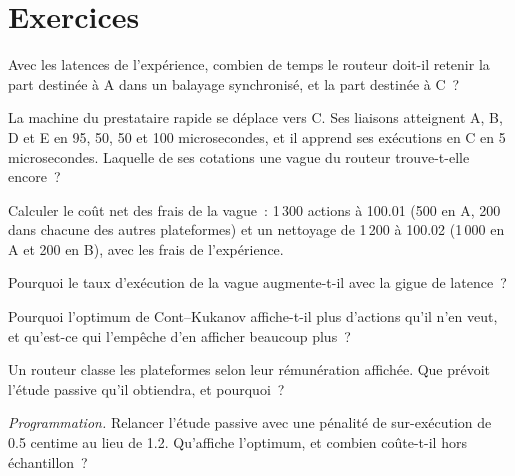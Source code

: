 \section{Exercices}

\begin{exercise}[$\star$]\label{exo:mx:smart-order-routing:1}
Avec les latences de l'expérience, combien de temps le routeur doit-il retenir la part destinée à A dans un balayage synchronisé, et la part destinée à C~?
\end{exercise}

\begin{exercise}[$\star$]\label{exo:mx:smart-order-routing:2}
La machine du prestataire rapide se déplace vers C. Ses liaisons atteignent A, B, D et E en 95, 50, 50 et 100 microsecondes, et il apprend ses exécutions en C en
5 microsecondes. Laquelle de ses cotations une vague du routeur trouve-t-elle encore~?
\end{exercise}

\begin{exercise}[$\star$]\label{exo:mx:smart-order-routing:3}
Calculer le coût net des frais de la vague~: 1\,300 actions à 100.01 (500 en A, 200 dans chacune des autres plateformes) et un nettoyage de 1\,200 à 100.02 (1\,000
en A et 200 en B), avec les frais de l'expérience.
\end{exercise}

\begin{exercise}[$\star\star$]\label{exo:mx:smart-order-routing:4}
Pourquoi le taux d'exécution de la vague augmente-t-il avec la gigue de latence~?
\end{exercise}

\begin{exercise}[$\star\star$]\label{exo:mx:smart-order-routing:5}
Pourquoi l'optimum de Cont--Kukanov affiche-t-il plus d'actions qu'il n'en veut, et qu'est-ce qui l'empêche d'en afficher beaucoup plus~?
\end{exercise}

\begin{exercise}[$\star\star$]\label{exo:mx:smart-order-routing:6}
Un routeur classe les plateformes selon leur rémunération affichée. Que prévoit l'étude passive qu'il obtiendra, et pourquoi~?
\end{exercise}

\begin{exercise}[$\star\star\star$]\label{exo:mx:smart-order-routing:7}
\emph{Programmation.} Relancer l'étude passive avec une pénalité de sur-exécution de 0.5 centime au lieu de 1.2. Qu'affiche l'optimum, et combien coûte-t-il hors
échantillon~?
\end{exercise}

